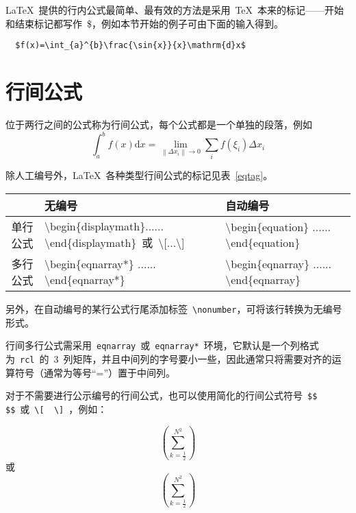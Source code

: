 \LaTeX~提供的行内公式最简单、最有效的方法是采用~\TeX~本来的标记——开始和结束标记都写作~\$，例如本节开始的例子可由下面的输入得到。
\begin{lstlisting}
  $f(x)=\int_{a}^{b}\frac{\sin{x}}{x}\mathrm{d}x$
\end{lstlisting}

\section{行间公式}

位于两行之间的公式称为行间公式，每个公式都是一个单独的段落，例如
\[\int_a^b{f\left(x\right)\mathrm{d}x}=\lim_{\left\|\Delta{x_i}\right\|\to 0}\sum_i{f\left(\xi_i\right)\Delta{x_i}}\]

除人工编号外，\LaTeX~各种类型行间公式的标记见表~\ref{eqtag}。
\begin{table}[htbp]
  \vspace{0.5em}\centering\wuhao
  \begin{tabularx}{0.9\textwidth}{cXX}
    \toprule
             & 无编号                                                                                                             & 自动编号                                                               \\\midrule
    单行公式 & \textbackslash begin\{displaymath\}...... \textbackslash end\{displaymath\}~或~\textbackslash [...\textbackslash ] & \textbackslash begin\{equation\} ...... \textbackslash end\{equation\} \\
    多行公式 & \textbackslash begin\{eqnarray*\} ...... \textbackslash end\{eqnarray*\}                                           & \textbackslash begin\{eqnarray\} ...... \textbackslash end\{eqnarray\} \\
    \bottomrule
  \end{tabularx}
\end{table}

另外，在自动编号的某行公式行尾添加标签~\verb|\nonumber|，可将该行转换为无编号形式。

行间多行公式需采用~\verb|eqnarray|~或~\verb|eqnarray*|~环境，它默认是一个列格式为~\verb|rcl|~的~3~列矩阵，并且中间列的字号要小一些，因此通常只将需要对齐的运算符号（通常为等号“=”）置于中间列。

对于不需要进行公示编号的行间公式，也可以使用简化的行间公式符号~\verb|$$  $$|~或~\verb|\[  \]|~，例如：

$$(\sum_{k=\frac12}^{N^2})$$
或
\[(\sum_{k=\frac12}^{N^2})\]

